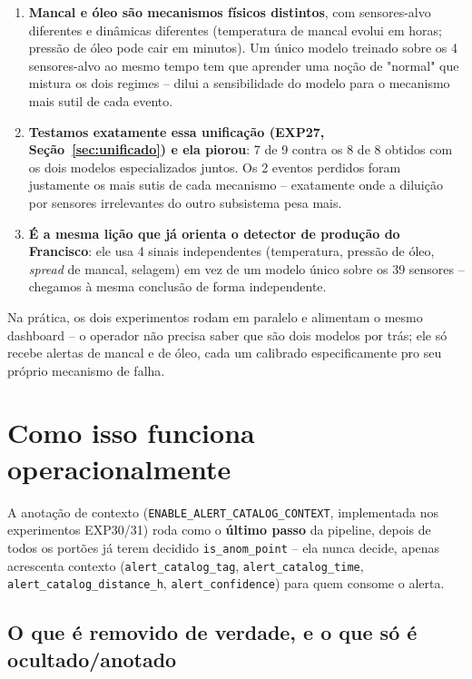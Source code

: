 \documentclass[11pt,a4paper]{article}
\begin{document}
\begin{enumerate}
  \item \textbf{Mancal e óleo são mecanismos físicos distintos}, com
    sensores-alvo diferentes e dinâmicas diferentes (temperatura de
    mancal evolui em horas; pressão de óleo pode cair em minutos). Um
    único modelo treinado sobre os 4 sensores-alvo ao mesmo tempo tem
    que aprender uma noção de "normal" que mistura os dois regimes --
    dilui a sensibilidade do modelo para o mecanismo mais sutil de
    cada evento.
  \item \textbf{Testamos exatamente essa unificação (EXP27,
    Seção~\ref{sec:unificado}) e ela piorou}: 7 de 9 contra os 8 de 8
    obtidos com os dois modelos especializados juntos. Os 2 eventos
    perdidos foram justamente os mais sutis de cada mecanismo --
    exatamente onde a diluição por sensores irrelevantes do outro
    subsistema pesa mais.
  \item \textbf{É a mesma lição que já orienta o detector de produção
    do Francisco}: ele usa 4 sinais independentes (temperatura,
    pressão de óleo, \textit{spread} de mancal, selagem) em vez de um
    modelo único sobre os 39 sensores -- chegamos à mesma conclusão de
    forma independente.
\end{enumerate}

Na prática, os dois experimentos rodam em paralelo e alimentam o mesmo
dashboard -- o operador não precisa saber que são dois modelos
por trás; ele só recebe alertas de mancal e de óleo, cada um calibrado
especificamente pro seu próprio mecanismo de falha.

\section{Como isso funciona operacionalmente}
\label{sec:operacional}

A anotação de contexto (\texttt{ENABLE\_ALERT\_CATALOG\_CONTEXT},
implementada nos experimentos EXP30/31) roda como o \textbf{último
passo} da pipeline, depois de todos os portões já terem decidido
\texttt{is\_anom\_point} -- ela nunca decide, apenas acrescenta
contexto (\texttt{alert\_catalog\_tag}, \texttt{alert\_catalog\_time},
\texttt{alert\_catalog\_distance\_h}, \texttt{alert\_confidence}) para
quem consome o alerta.

\subsection{O que é removido de verdade, e o que só é ocultado/anotado}
\label{sec:tratamento-fp-final}
\end{document}

